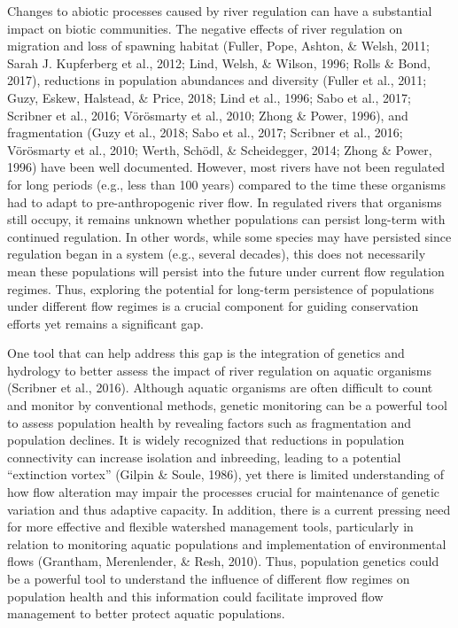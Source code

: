 \documentclass[twoside,12pt,final]{ucthesis-CA2012} %
\begin{document}
\begin{ucmainmatter}
Changes to abiotic processes caused by river regulation can have a
substantial impact on biotic communities. The negative effects of river
regulation on migration and loss of spawning habitat (Fuller, Pope,
Ashton, \& Welsh, 2011; Sarah J. Kupferberg et al., 2012; Lind, Welsh,
\& Wilson, 1996; Rolls \& Bond, 2017), reductions in population
abundances and diversity (Fuller et al., 2011; Guzy, Eskew, Halstead, \&
Price, 2018; Lind et al., 1996; Sabo et al., 2017; Scribner et al.,
2016; Vörösmarty et al., 2010; Zhong \& Power, 1996), and fragmentation
(Guzy et al., 2018; Sabo et al., 2017; Scribner et al., 2016; Vörösmarty
et al., 2010; Werth, Schödl, \& Scheidegger, 2014; Zhong \& Power, 1996)
have been well documented. However, most rivers have not been regulated
for long periods (e.g., less than 100 years) compared to the time these
organisms had to adapt to pre-anthropogenic river flow. In regulated
rivers that organisms still occupy, it remains unknown whether
populations can persist long-term with continued regulation. In other
words, while some species may have persisted since regulation began in a
system (e.g., several decades), this does not necessarily mean these
populations will persist into the future under current flow regulation
regimes. Thus, exploring the potential for long-term persistence of
populations under different flow regimes is a crucial component for
guiding conservation efforts yet remains a significant gap.

One tool that can help address this gap is the integration of genetics
and hydrology to better assess the impact of river regulation on aquatic
organisms (Scribner et al., 2016). Although aquatic organisms are often
difficult to count and monitor by conventional methods, genetic
monitoring can be a powerful tool to assess population health by
revealing factors such as fragmentation and population declines. It is
widely recognized that reductions in population connectivity can
increase isolation and inbreeding, leading to a potential ``extinction
vortex'' (Gilpin \& Soule, 1986), yet there is limited understanding of
how flow alteration may impair the processes crucial for maintenance of
genetic variation and thus adaptive capacity. In addition, there is a
current pressing need for more effective and flexible watershed
management tools, particularly in relation to monitoring aquatic
populations and implementation of environmental flows (Grantham,
Merenlender, \& Resh, 2010). Thus, population genetics could be a
powerful tool to understand the influence of different flow regimes on
population health and this information could facilitate improved flow
management to better protect aquatic populations.


\end{ucmainmatter}
\end{document}
